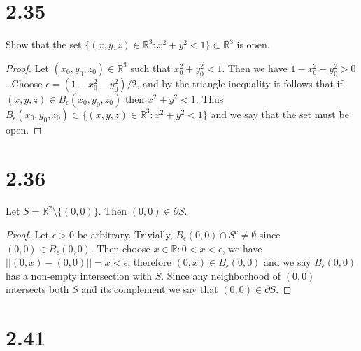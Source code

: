 \documentclass{article}
\theoremstyle{definition}
\begin{document}
\section*{2.35}
\begin{mdframed}
    Show that the set $\{(x,y,z) \in \mathbb{R}^3 : x^2 + y^2 < 1 \} \subset \mathbb{R}^3$ is open.
\end{mdframed}
\begin{proof}
    Let $(x_0,y_0,z_0) \in \mathbb{R}^3$ such that $x_0^2 + y_0^2 < 1$.
    Then we have $1 - x_0^2 - y_0^2 > 0$. Choose $\epsilon = (1 - x_0^2 - y_0^2)/2$, and by the 
    triangle inequality it follows that if $(x,y,z) \in B_\epsilon(x_0,y_0,z_0)$ then $x^2 + y^2 < 1$.
    Thus $B_\epsilon(x_0,y_0,z_0) \subset \{(x,y,z) \in \mathbb{R}^3 : x^2 + y^2 < 1 \}$ and we say that the set must be open.
\end{proof}
\section*{2.36}
\begin{mdframed}
    Let $S = \mathbb{R}^2 \setminus \{(0,0)\}$. Then $(0,0) \in \partial S$.
\end{mdframed}
\begin{proof}
    Let $\epsilon > 0$ be arbitrary. Trivially, $B_\epsilon(0,0) \cap S^c \neq \emptyset$ since $(0,0) \in B_\epsilon(0,0)$.
    Then choose $x \in \mathbb{R} : 0 < x < \epsilon$, we have $||(0,x) - (0,0)|| = x < \epsilon$,
    therefore $(0,x) \in B_\epsilon(0,0)$ and we say $B_\epsilon(0,0)$ has a non-empty intersection with $S$.
    Since any neighborhood of $(0,0)$ intersects both $S$ and its complement we say that $(0,0) \in \partial S$.
\end{proof}
\section*{2.41}
\end{document}
